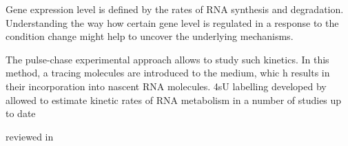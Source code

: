 Gene expression level is defined by the rates of RNA synthesis and degradation.
Understanding the way how certain gene level is regulated in a response to
the condition change might help to uncover the underlying mechanisms.
\par
The pulse-chase experimental approach allows to study such kinetics. 
 In this method, a tracing molecules are introduced to the medium, 
 whic	h results in their incorporation into nascent RNA molecules.
4sU labelling developed by \citep{dolken2008high} allowed to estimate 
kinetic rates of RNA metabolism in a number of studies up to date 

reviewed in \citep{wachutka2016measures}